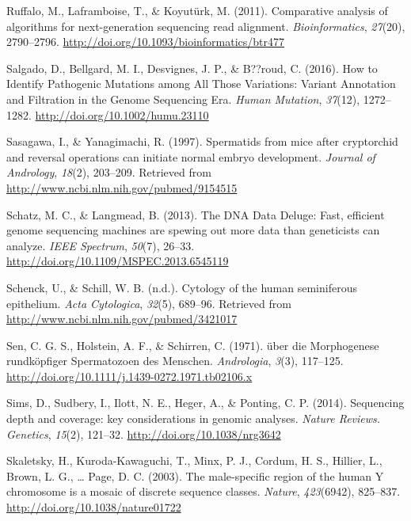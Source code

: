 \documentclass[12pt,twoside]{reedthesis}
\theoremstyle{definition}
\theoremstyle{definition}
\theoremstyle{remark}
\begin{document}
  \hypertarget{ref-Ruffalo2011}{}
  Ruffalo, M., Laframboise, T., \& Koyutürk, M. (2011). Comparative
  analysis of algorithms for next-generation sequencing read alignment.
  \emph{Bioinformatics}, \emph{27}(20), 2790--2796.
  \url{http://doi.org/10.1093/bioinformatics/btr477}
  
  \hypertarget{ref-Salgado2016}{}
  Salgado, D., Bellgard, M. I., Desvignes, J. P., \& B??roud, C. (2016).
  How to Identify Pathogenic Mutations among All Those Variations: Variant
  Annotation and Filtration in the Genome Sequencing Era. \emph{Human
  Mutation}, \emph{37}(12), 1272--1282.
  \url{http://doi.org/10.1002/humu.23110}
  
  \hypertarget{ref-Sasagawa}{}
  Sasagawa, I., \& Yanagimachi, R. (1997). Spermatids from mice after
  cryptorchid and reversal operations can initiate normal embryo
  development. \emph{Journal of Andrology}, \emph{18}(2), 203--209.
  Retrieved from \url{http://www.ncbi.nlm.nih.gov/pubmed/9154515}
  
  \hypertarget{ref-Schatz2013}{}
  Schatz, M. C., \& Langmead, B. (2013). The DNA Data Deluge: Fast,
  efficient genome sequencing machines are spewing out more data than
  geneticists can analyze. \emph{IEEE Spectrum}, \emph{50}(7), 26--33.
  \url{http://doi.org/10.1109/MSPEC.2013.6545119}
  
  \hypertarget{ref-Schenck}{}
  Schenck, U., \& Schill, W. B. (n.d.). Cytology of the human seminiferous
  epithelium. \emph{Acta Cytologica}, \emph{32}(5), 689--96. Retrieved
  from \url{http://www.ncbi.nlm.nih.gov/pubmed/3421017}
  
  \hypertarget{ref-Sen2009}{}
  Sen, C. G. S., Holstein, A. F., \& Schirren, C. (1971). über die
  Morphogenese rundköpfiger Spermatozoen des Menschen. \emph{Andrologia},
  \emph{3}(3), 117--125.
  \url{http://doi.org/10.1111/j.1439-0272.1971.tb02106.x}
  
  \hypertarget{ref-Sims2014}{}
  Sims, D., Sudbery, I., Ilott, N. E., Heger, A., \& Ponting, C. P.
  (2014). Sequencing depth and coverage: key considerations in genomic
  analyses. \emph{Nature Reviews. Genetics}, \emph{15}(2), 121--32.
  \url{http://doi.org/10.1038/nrg3642}
  
  \hypertarget{ref-Skaletsky2003}{}
  Skaletsky, H., Kuroda-Kawaguchi, T., Minx, P. J., Cordum, H. S.,
  Hillier, L., Brown, L. G., \ldots{} Page, D. C. (2003). The
  male-specific region of the human Y chromosome is a mosaic of discrete
  sequence classes. \emph{Nature}, \emph{423}(6942), 825--837.
  \url{http://doi.org/10.1038/nature01722}
  
\end{document}
